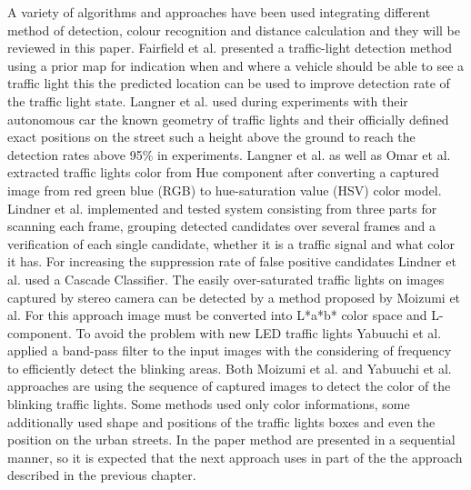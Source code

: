 \documentclass[letterpaper, 10 pt, conference]{ieeeconf} %
\begin{document}
A variety of algorithms and approaches have been used integrating different method of detection, colour recognition and distance calculation and they will be reviewed in this paper. Fairfield et al. \cite{c5} presented a traffic-light detection method using a prior map for indication when and where a vehicle should be able to see a traffic light this the predicted location can be used to improve detection rate of the traffic light state. Langner et al. \cite{c4} used during experiments with their autonomous car the known geometry of traffic lights and their officially defined exact positions on the street such a height above the ground to reach the detection rates above 95\% in experiments. Langner et al. as well as Omar et al. \cite{c4} extracted traffic lights color from Hue component after converting a captured image from red green blue (RGB) to hue-saturation value (HSV) color model. Lindner et al. \cite{c6} implemented and tested system consisting from three parts for scanning each frame, grouping detected candidates over several frames and a verification of each single candidate, whether it is a traffic signal and what color it has. For increasing the suppression rate of false positive candidates Lindner et al. used a Cascade Classifier. The easily over-saturated traffic lights on images captured by stereo camera can be detected by a method proposed by Moizumi et al. \cite{c3} For this approach image must be converted into L*a*b* color space and L-component.  To avoid the problem with new LED traffic lights Yabuuchi et al. \cite{c8} applied a band-pass filter to the input images with the considering of frequency to efficiently detect the blinking areas. Both Moizumi et al. and Yabuuchi et al. approaches are using the sequence of captured images to detect the color of the blinking traffic lights. Some methods used only color informations, some additionally used shape and positions of the traffic lights boxes and even the position on the urban streets. In the paper method are presented in a sequential manner, so it is expected that the next approach uses in part of the the approach described in the previous chapter.
\end{document}

